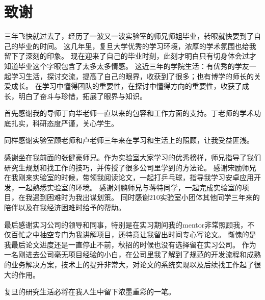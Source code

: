 \chapter{致谢}

三年飞快就过去了，经历了一波又一波实验室的师兄师姐毕业，转眼就快要到了自己的毕业的时间。 
这几年里，复旦大学优秀的学习环境，浓厚的学术氛围也给我留下了深刻的印象。
现在迎来了自己的毕业时刻，此刻才明白只有切身体会过才知道毕业这个字眼包含了太多太多情感。
这近三年的学院生活：有优秀的学友一起学习生活，探讨交流，提高了自己的眼界，收获到了很多；也有博学的师长的关爱成长。
在学习中懂得团队的重要性，在探讨中懂得方向的重要性，收获了成长，明白了奋斗与珍惜，拓展了眼界与知识。

首先感谢我的导师丁向华老师一直以来的包容和工作方面的支持。丁老师的学术功底扎实，科研态度严谨，关心学生。

同样感谢实验室顾老师和卢老师三年来在学习和生活上的照顾，让我受益匪浅。

感谢坐在我前面的张健豪师兄。作为实验室大家学习的优秀榜样，师兄指导了我们研究生规划和找工作的技巧，并传授了很多公司里学到的方法论。
感谢宋励师兄在我刚来实验室的时候，带领我阅读论文，一起打乒乓球，指导我学习安卓应用开发，一起熟悉实验室的环境。 
感谢刘鹏师兄与蒋特同学，一起完成实验室的项目，在我遇到困难时为我出谋划策。
同时感谢210实验室小团体其他同学三年来的陪伴以及在我经济困难时给予的帮助。

最后感谢实习公司的领导和同事，特别是在实习期间我的mentor非常照顾我，不仅百忙之中抽空专门为我讲解项目，还特意让我留出时间专心写论文。
惭愧的是我最后论文进度还是一直停止不前，秋招的时候也没有选择留在实习公司。
作为一名刚进去公司毫无项目经验的小白，在公司里我了解到了规范的开发流程和成熟的业务解决方案，技术上的提升非常大，对论文的系统实现以及后续找工作起了很大的作用。

复旦的研究生活必将在我人生中留下浓墨重彩的一笔。